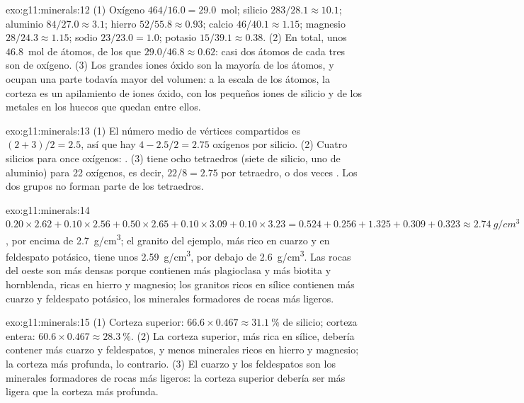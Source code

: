 \begin{solution}{exo:g11:minerals:12}
(1) Oxígeno $464/16.0 = 29.0$~mol; silicio $283/28.1 \approx 10.1$; aluminio
$84/27.0 \approx 3.1$; hierro $52/55.8 \approx 0.93$; calcio $46/40.1 \approx
1.15$; magnesio $28/24.3 \approx 1.15$; sodio $23/23.0 = 1.0$; potasio
$15/39.1 \approx 0.38$. (2) En total, unos $46.8$~mol de átomos, de los que
$29.0/46.8 \approx 0.62$: casi dos átomos de cada tres son de oxígeno.
(3) Los grandes iones óxido son la mayoría de los átomos, y ocupan una parte
todavía mayor del volumen: a la escala de los átomos, la corteza es un
apilamiento de iones óxido, con los pequeños iones de silicio y de los
metales en los huecos que quedan entre ellos.
\end{solution}

\begin{solution}{exo:g11:minerals:13}
(1) El número medio de vértices compartidos es $(2 + 3)/2 = 2.5$, así que hay
$4 - 2.5/2 = 2.75$ oxígenos por silicio. (2) Cuatro silicios para once
oxígenos: . (3)  tiene ocho tetraedros (siete de
silicio, uno de aluminio) para 22 oxígenos, es decir, $22/8 = 2.75$ por
tetraedro, o dos veces . Los dos grupos  no forman parte de
los tetraedros.
\end{solution}

\begin{solution}{exo:g11:minerals:14}
$0.20 \times 2.62 + 0.10 \times 2.56 + 0.50 \times 2.65 + 0.10 \times 3.09 +
0.10 \times 3.23 = 0.524 + 0.256 + 1.325 + 0.309 + 0.323 \approx
\qty{2.74}{g/cm^3}$, por encima de \qty{2.7}{g/cm^3}; el granito del ejemplo,
más rico en cuarzo y en feldespato potásico, tiene unos \qty{2.59}{g/cm^3},
por debajo de \qty{2.6}{g/cm^3}. Las rocas del oeste son más densas porque
contienen más plagioclasa y más biotita y hornblenda, ricas en hierro y
magnesio; los granitos ricos en sílice contienen más cuarzo y feldespato
potásico, los minerales formadores de rocas más ligeros.
\end{solution}

\begin{solution}{exo:g11:minerals:15}
(1) Corteza superior: $66.6 \times 0.467 \approx \qty{31.1}{\percent}$ de
silicio; corteza entera: $60.6 \times 0.467 \approx \qty{28.3}{\percent}$.
(2) La corteza superior, más rica en sílice, debería contener más cuarzo y
feldespatos, y menos minerales ricos en hierro y magnesio; la corteza más
profunda, lo contrario. (3) El cuarzo y los feldespatos son los minerales
formadores de rocas más ligeros: la corteza superior debería ser más ligera
que la corteza más profunda.
\end{solution}

